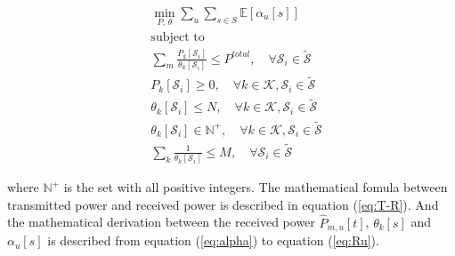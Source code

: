 \begin{subequations} \label{eq:main}
\begin{align}
    &\min_{P,\,\theta} \sum_{u} \sum_{s\in S} \mathbb{E}[\alpha_u[s]] \\ 
    &\text{subject to} \nonumber \\
    &\sum_{m} \frac{P_{k}[\mathcal{S}_i]}{\theta_k[\mathcal{S}_i]} \leq P^{total}, \quad \forall \mathcal{S}_i \in \mathcal{\widetilde{S}} \label{eq:power_constraint} \\ 
    &P_k[\mathcal{S}_i]\geq 0, \quad \forall k\in\mathcal{K}, \mathcal{S}_i\in\mathcal{\widetilde{S}} \label{eq:power_nonnegative} \\
    &\theta_k[\mathcal{S}_i] \leq N, \quad \forall k\in\mathcal{K}, \mathcal{S}_i\in\mathcal{\widetilde{S}} \label{eq:theta_upper} \\
    &\theta_k[\mathcal{S}_i] \in \mathbb{N}^+, \quad \forall k\in\mathcal{K}, \mathcal{S}_i\in\mathcal{\widetilde{S}} \label{eq:theta_positive} \\
    &\sum_k \frac{1}{\theta_k[\mathcal{S}_i]} \leq M, \quad \forall \mathcal{S}_i\in\mathcal{\widetilde{S}} \label{eq:sum_constraint}
\end{align}
\end{subequations}

where $\mathbb{N}^+$ is the set with all positive integers. The mathematical fomula between transmitted power and received power is described in equation (\ref{eq:T-R}). And the mathematical derivation between the received power $\hat{P}_{m, u}[t]$, $\theta_k[s]$ and $\alpha_u[s]$ is described from equation (\ref{eq:alpha}) to equation (\ref{eq:Ru}). 

